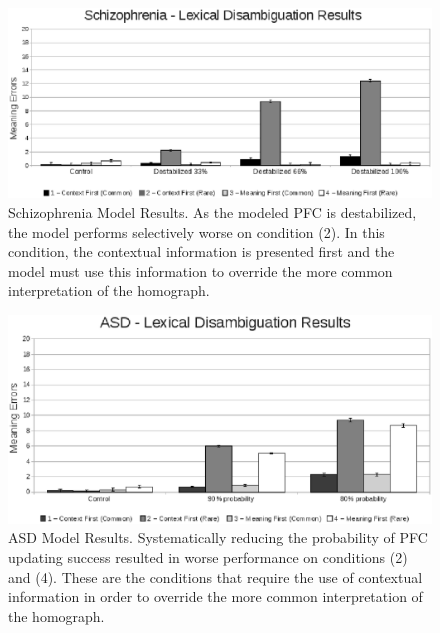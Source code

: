 \begin{figure}[tp]
\begin{center}
	\includegraphics[width=140mm]{graphs/schiz_lexamb_results.eps}
\end{center}
\caption{Schizophrenia Model Results. As the modeled PFC is destabilized, the model performs selectively worse on condition (2).  In this condition, the contextual information is presented first and the model must use this information to override the more common interpretation of the homograph.} 
\label{Schiz-Amb-Results}
\end{figure} 

\begin{figure}[tp]
\begin{center}
	\includegraphics[width=140mm]{graphs/asd_lexamb_results.eps}
\end{center}
\caption{ASD Model Results. Systematically reducing the probability of PFC updating success resulted in worse performance on conditions (2) and (4). These are the conditions that require the use of contextual information in order to override the more common interpretation of the homograph.} 
\label{ASD-Amb-Results}
\end{figure} 

